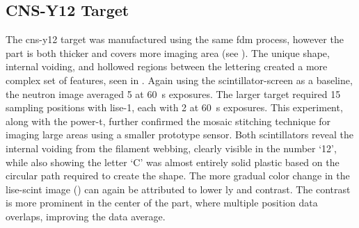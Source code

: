 \documentclass[../../../main.tex]{subfiles}%
\begin{document}
%
    \subsection{CNS-Y12 Target}%
    \label{sec:chapter-4:scintillator-single:cns-y12}%
    The \gls{cns-y12} target was manufactured using the same \gls{fdm} process, however the part is both thicker and covers more imaging area (see ).
    The unique shape, internal voiding, and hollowed regions between the lettering created a more complex set of features, seen in .
    Again using the \gls{scintillator-screen} as a baseline, the neutron image averaged \SI{5}{\frames} at \SI{60}{\second} exposures.
    The larger target required \num{15} sampling positions with \gls{lise-1}, each with \SI{2}{\frames} at \SI{60}{\second} exposures.
    This experiment, along with the \gls{power-t}, further confirmed the mosaic stitching technique for imaging large areas using a smaller prototype sensor.
    Both scintillators reveal the internal voiding from the filament webbing, clearly visible in the number `12', while also showing the letter `C' was almost entirely solid plastic based on the circular path required to create the shape.
    The more gradual color change in the \gls{lise-scint} image () can again be attributed to lower \gls{ly} and contrast.
    The contrast is more prominent in the center of the part, where multiple position data overlaps, improving the data average.
\end{document}

